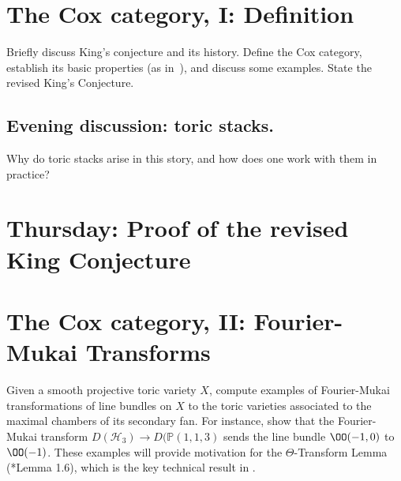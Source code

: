\documentclass[11pt]{amsart}
\numberwithin{equation}{section}
\theoremstyle{definition}
\theoremstyle{remark}
\newcommand{\PP}{\mathbb P}
\begin{document}




\section{The Cox category, I: Definition}

Briefly discuss King's conjecture and its history.
Define the Cox category, establish its basic properties (as in~\cite[\S3]{king}), and discuss some examples. State the revised King's Conjecture.

\subsection*{Evening discussion: toric stacks.} Why do toric stacks arise in this story, and how does one work with them in practice?

\section*{Thursday: Proof of the revised King Conjecture}




\section{The Cox category, II: Fourier-Mukai Transforms}

Given a smooth projective toric variety $X$, compute examples of Fourier-Mukai transformations of line bundles on $X$ to the  toric varieties associated to the maximal chambers of its secondary fan. For instance, show that the Fourier-Mukai transform $D(\mathcal{H}_3) \to D(\PP(1,1,3)$ sends the line bundle $\OO(-1, 0)$ to $\OO(-1)$. These examples  will provide motivation for the $\Theta$-Transform Lemma (\cite{king}*{Lemma 1.6}), which is the key technical result in \cite{king}. 
    
\end{document}
